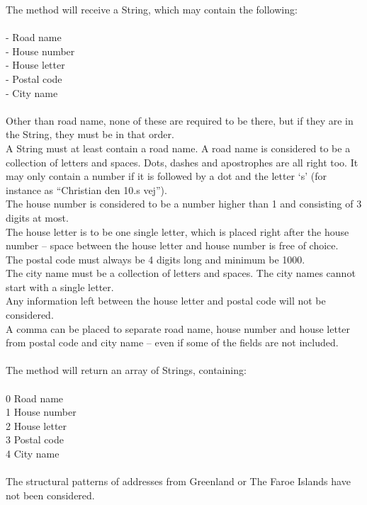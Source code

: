 \documentclass[a4paper,10pt,titlepage]{article}
\begin{document}
The method will receive a String, which may contain the following:\\
\\
-	Road name\\
-	House number\\
-	House letter\\
-	Postal code\\
-	City name\\
\\
Other than road name, none of these are required to be there, but if they are in the String, they must be in that order.\\
A String must at least contain a road name. A road name is considered to be a collection of letters and spaces. Dots, dashes and apostrophes are all right too. It may only contain a number if it is followed by a dot and the letter ‘s’ (for instance as “Christian den 10.s vej”).\\
The house number is considered to be a number higher than 1 and consisting of 3 digits at most.\\
The house letter is to be one single letter, which is placed right after the house number – space between the house letter and house number is free of choice.\\
The postal code must always be 4 digits long and minimum be 1000.\\
The city name must be a collection of letters and spaces. The city names cannot start with a single letter.\\
Any information left between the house letter and postal code will not be considered.\\
A comma can be placed to separate road name, house number and house letter from postal code and city name – even if some of the fields are not included.\\
\\
The method will return an array of Strings, containing:\\
\\
0	Road name\\
1	House number\\
2	House letter\\
3	Postal code\\
4	City name\\
\\
The structural patterns of addresses from Greenland or The Faroe Islands have not been considered.\\
\end{document}

